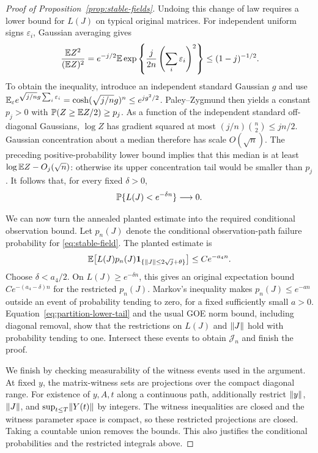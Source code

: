 \begin{proof}[Proof of Proposition~\ref{prop:stable-fields}]
Undoing this change of law requires a lower bound for $L(J)$ on
typical original matrices. For independent uniform signs $\varepsilon_i$,
Gaussian averaging gives
\[
 \frac{\mathbb E Z^2}{(\mathbb E Z)^2}
 =e^{-j/2}\mathbb E\exp\left\{\frac j{2n}
                       \left(\sum_i\varepsilon_i\right)^2\right\}
 \le(1-j)^{-1/2}.
\]
To obtain the inequality, introduce an independent standard Gaussian
$g$ and use
$\mathbb E_\varepsilon e^{\sqrt{j/n}g\sum_i\varepsilon_i}
 =\cosh(\sqrt{j/n}g)^n\le e^{jg^2/2}$.
Paley--Zygmund then yields a constant $p_j>0$ with
$\mathbb P(Z\ge\mathbb E Z/2)\ge p_j$.  As a function of the independent
standard off-diagonal Gaussians, $\log Z$ has gradient squared at
most $(j/n)\binom n2\le jn/2$.  Gaussian concentration about a median
therefore has scale $O(\sqrt n)$.  The preceding positive-probability
lower bound implies that this median is at least
$\log\mathbb E Z-O_j(\sqrt n)$: otherwise its upper concentration tail
would be smaller than $p_j$.  It follows that, for every fixed
$\delta>0$,
\begin{equation}
 \mathbb P\{L(J)<e^{-\delta n}\}\longrightarrow0.
 \label{eq:partition-lower-tail}
\end{equation}

We can now turn the annealed planted estimate into the required
conditional observation bound. Let $p_n(J)$ denote the conditional
observation-path failure probability for \eqref{eq:stable-field}.
The planted estimate is
\[
 \mathbb E\bigl[L(J)p_n(J)
       \mathbf 1_{\{\lVert J\rVert\le2\sqrt j+\theta\}}\bigr]
 \le Ce^{-a_4n}.
\]
Choose $\delta<a_4/2$.  On $L(J)\ge e^{-\delta n}$, this gives an
original expectation bound $Ce^{-(a_4-\delta)n}$ for the restricted
$p_n(J)$.  Markov's inequality makes $p_n(J)\le e^{-an}$ outside an
event of probability tending to zero, for a fixed sufficiently small
$a>0$.  Equation~\eqref{eq:partition-lower-tail} and the usual GOE norm
bound, including diagonal removal, show that the restrictions on
$L(J)$ and $\lVert J\rVert$ hold with probability tending to one.  Intersect
these events to obtain $\mathcal J_n$ and finish the proof.

We finish by checking measurability of the witness events used in the
argument. At fixed $y$, the matrix-witness sets are projections over
the compact diagonal range.  For existence
of $y,A,t$ along a continuous path, additionally restrict
$\lVert y\rVert$, $\lVert J\rVert$, and $\sup_{t\le T}\lVert Y(t)\rVert$ by integers.
The witness inequalities are closed and the witness parameter space
is compact, so these restricted projections are closed.  Taking a
countable union removes the bounds.  This also justifies the
conditional probabilities and the restricted integrals above.
\end{proof}

